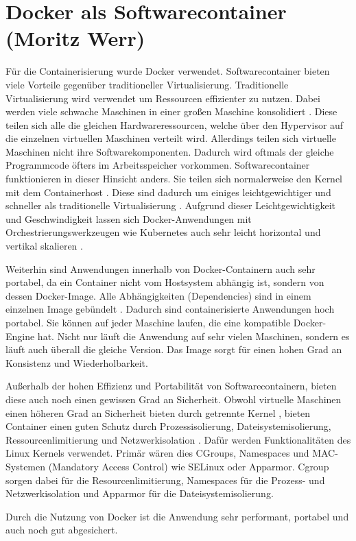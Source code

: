 \chapter{Docker als Softwarecontainer (Moritz Werr)}

Für die Containerisierung wurde Docker verwendet. Softwarecontainer bieten viele Vorteile gegenüber traditioneller Virtualisierung. Traditionelle Virtualisierung wird verwendet um Ressourcen effizienter zu nutzen. Dabei werden viele schwache Maschinen in einer großen Maschine konsolidiert \cite[Vgl. S.152443]{watada_emerging_2019}. Diese teilen sich alle die gleichen Hardwareressourcen, welche über den Hypervisor auf die einzelnen virtuellen Maschinen verteilt wird. Allerdings teilen sich virtuelle Maschinen nicht ihre Softwarekomponenten. Dadurch wird oftmals der gleiche Programmcode öfters im Arbeitsspeicher vorkommen. Softwarecontainer funktionieren in dieser Hinsicht anders. Sie teilen sich normalerweise den Kernel mit dem Containerhost \cite[Vgl. S.152444]{watada_emerging_2019}. Diese sind dadurch um einiges leichtgewichtiger und schneller als traditionelle Virtualisierung \cite[Vgl. S.137]{fava_assessing_2024}. 
Aufgrund dieser Leichtgewichtigkeit und Geschwindigkeit lassen sich Docker-Anwendungen mit Orchestrierungswerkzeugen wie Kubernetes auch sehr leicht horizontal und vertikal skalieren \cite[Vgl. S.152458]{watada_emerging_2019}. 

Weiterhin sind Anwendungen innerhalb von Docker-Containern auch sehr portabel, da ein Container nicht vom Hostsystem abhängig ist, sondern von dessen Docker-Image. Alle Abhängigkeiten (Dependencies) sind in einem einzelnen Image gebündelt  \cite[Vgl. S.137]{fava_assessing_2024}. Dadurch sind containerisierte Anwendungen hoch portabel. Sie können auf jeder Maschine laufen, die eine kompatible Docker-Engine hat. Nicht nur läuft die Anwendung auf sehr vielen Maschinen, sondern es läuft auch überall die gleiche Version. Das Image sorgt für einen hohen Grad an Konsistenz und Wiederholbarkeit.

Außerhalb der hohen Effizienz und Portabilität von Softwarecontainern, bieten diese auch noch einen gewissen Grad an Sicherheit. Obwohl virtuelle Maschinen einen höheren Grad an Sicherheit bieten durch getrennte Kernel \cite[Vgl. S.152455]{watada_emerging_2019}, bieten Container einen guten Schutz durch Prozessisolierung, Dateisystemisolierung, Ressourcenlimitierung und Netzwerkisolation \cite[Vgl. S.152444ff]{watada_emerging_2019}. Dafür werden Funktionalitäten des Linux Kernels verwendet. Primär wären dies CGroups, Namespaces und MAC-Systemen (Mandatory Access Control) wie SELinux oder Apparmor. Cgroup sorgen dabei für die Resourcenlimitierung, Namespaces für die Prozess- und Netzwerkisolation und Apparmor für die Dateisystemisolierung.

Durch die Nutzung von Docker ist die Anwendung sehr performant, portabel und auch noch gut abgesichert. 